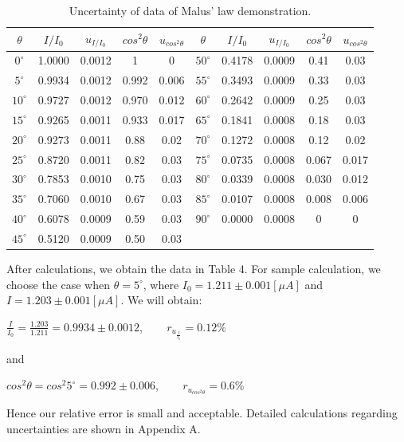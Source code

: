 \documentclass[a4paper,12pt]{article}
\begin{document}
\begin{table}[h]
\begin{center}
\begin{tabular}{|c|c|c|c|c||c|c|c|c|c|}
\hline
$\theta$ & $I / I_0$ & $u_{I / I_0}$ & $cos^2\theta$ & $u_{cos^2\theta}$ & $\theta$ & $I / I_0$ &  $u_{I / I_0}$ & $cos^2\theta$ & $u_{cos^2\theta}$ \\
\hline
$0^{\circ}$ & 1.0000 & 0.0012 & 1 & 0 & $50^{\circ}$ & 0.4178 & 0.0009 & 0.41 & 0.03\\
\hline 
$5^{\circ}$ & 0.9934 & 0.0012 & 0.992 & 0.006 & $55^{\circ}$ & 0.3493 & 0.0009 & 0.33 & 0.03\\
\hline 
$10^{\circ}$ & 0.9727 & 0.0012 & 0.970 & 0.012 & $60^{\circ}$ & 0.2642 & 0.0009 & 0.25 & 0.03\\
\hline 
$15^{\circ}$ & 0.9265 & 0.0011 & 0.933 & 0.017 & $65^{\circ}$ & 0.1841 & 0.0008 & 0.18 & 0.03\\
\hline 
$20^{\circ}$ & 0.9273 & 0.0011 & 0.88 & 0.02 & $70^{\circ}$ & 0.1272 & 0.0008 & 0.12 & 0.02\\
\hline 
$25^{\circ}$ & 0.8720 & 0.0011 & 0.82 & 0.03 & $75^{\circ}$ & 0.0735 & 0.0008 & 0.067 & 0.017\\
\hline 
$30^{\circ}$ & 0.7853 & 0.0010 & 0.75 & 0.03 & $80^{\circ}$ & 0.0339 & 0.0008 & 0.030 & 0.012\\
\hline 
$35^{\circ}$ & 0.7060 & 0.0010 & 0.67 & 0.03 & $85^{\circ}$ & 0.0107 & 0.0008 & 0.008 & 0.006\\
\hline 
$40^{\circ}$ & 0.6078 & 0.0009 & 0.59 & 0.03 & $90^{\circ}$ & 0.0000 & 0.0008 & 0 & 0\\
\hline 
$45^{\circ}$ & 0.5120 & 0.0009 & 0.50 & 0.03 &  &  &  &  & \\
\hline 
\end{tabular}
\caption{Uncertainty of data of Malus' law demonstration.}
\end{center}
\end{table}

After calculations, we obtain the data in Table 4. For sample calculation, we choose the case when $\theta = 5^{\circ}$, where $I_0 = 1.211 \pm 0.001[\mu A]$ and $I = 1.203 \pm 0.001[\mu A]$. We will obtain:
\begin{center}
$\displaystyle \frac{I}{I_0} = \frac{1.203}{1.211} = 0.9934 \pm 0.0012$, ~~~ $\displaystyle r_{u_{\frac{I}{I_0}}} = 0.12 \%$
\end{center}
and 
\begin{center}
$\displaystyle cos^2\theta = cos^2 5^{\circ}= 0.992 \pm 0.006$, ~~~ $\displaystyle r_{u_{cos^2\theta}} = 0.6 \%$
\end{center}
Hence our relative error is small and acceptable. Detailed calculations regarding uncertainties are shown in Appendix A.
\end{document}
